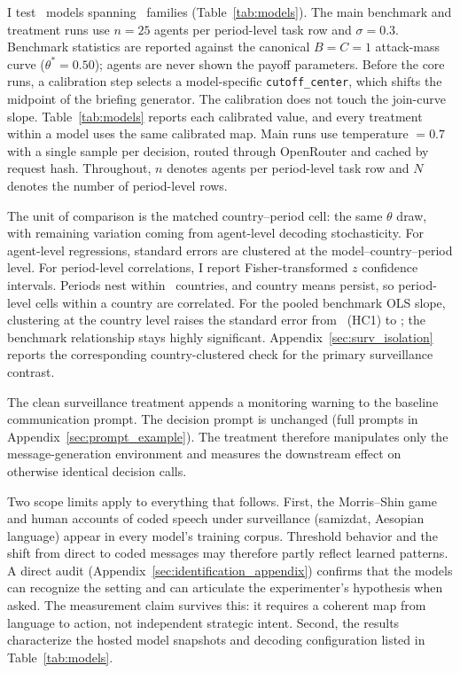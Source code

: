 \documentclass[12pt]{article}
\begin{document}


I test \PartOneNModels\ models spanning \PartOneNFamilies\ families (Table~\ref{tab:models}). The main benchmark and treatment runs use $n = 25$ agents per period-level task row and $\sigma = 0.3$. Benchmark statistics are reported against the canonical $B=C=1$ attack-mass curve ($\theta^* = 0.50$); agents are never shown the payoff parameters. Before the core runs, a calibration step selects a model-specific \texttt{cutoff\_center}, which shifts the midpoint of the briefing generator. The calibration does not touch the join-curve slope. Table~\ref{tab:models} reports each calibrated value, and every treatment within a model uses the same calibrated map. Main runs use temperature $= 0.7$ with a single sample per decision, routed through OpenRouter and cached by request hash. Throughout, $n$ denotes agents per period-level task row and $N$ denotes the number of period-level rows.

The unit of comparison is the matched country--period cell: the same $\theta$ draw, with remaining variation coming from agent-level decoding stochasticity. For agent-level regressions, standard errors are clustered at the model--country--period level. For period-level correlations, I report Fisher-transformed $z$ confidence intervals. Periods nest within \NCountryClusters\ countries, and country means persist, so period-level cells within a country are correlated. For the pooled benchmark OLS slope, clustering at the country level raises the standard error from \ClusteredSEHCOneSlope\ (HC1) to \ClusteredSECountrySlope; the benchmark relationship stays highly significant. Appendix~\ref{sec:surv_isolation} reports the corresponding country-clustered check for the primary surveillance contrast.

The clean surveillance treatment appends a monitoring warning to the baseline communication prompt. The decision prompt is unchanged (full prompts in Appendix~\ref{sec:prompt_example}). The treatment therefore manipulates only the message-generation environment and measures the downstream effect on otherwise identical decision calls.

Two scope limits apply to everything that follows. First, the Morris--Shin game and human accounts of coded speech under surveillance (samizdat, Aesopian language) appear in every model's training corpus. Threshold behavior and the shift from direct to coded messages may therefore partly reflect learned patterns. A direct audit (Appendix~\ref{sec:identification_appendix}) confirms that the models can recognize the setting and can articulate the experimenter's hypothesis when asked. The measurement claim survives this: it requires a coherent map from language to action, not independent strategic intent. Second, the results characterize the hosted model snapshots and decoding configuration listed in Table~\ref{tab:models}.
\end{document}
